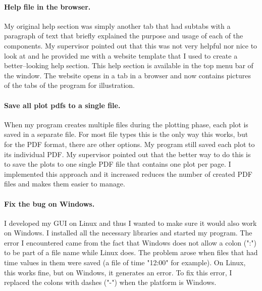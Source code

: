 \documentclass[../00_main.tex]{subfiles}
\begin{document}
\paragraph{Help file in the browser.} My original help section was simply
another tab that had subtabs with a paragraph of text that briefly explained
the purpose and usage of each of the components. My supervisor pointed out that
this was not very helpful nor nice to look at and he provided me with a website
template that I used to create a better--looking help section. This help
section is available in the top menu bar of the window. The website opens in
a tab in a browser and now contains pictures of the tabs of the program for
illustration.

\paragraph{Save all plot pdfs to a single file.} When my program creates
multiple files during the plotting phase, each plot is saved in a separate file.
For most file types this is the only way this works, but for the PDF format,
there are other options. My program still saved each plot to its individual
PDF. My supervisor pointed out that the better way to do this is to save the
plots to one single PDF file that contains one plot per page. I implemented
this approach and it increased reduces the number of created PDF files and
makes them easier to manage.

\paragraph{Fix the bug on Windows.} I developed my GUI on Linux and thus
I wanted to make sure it would also work on Windows. I installed all the
necessary libraries and started my program. The error I encountered came from
the fact that Windows does not allow a colon (":") to be part of a file name
while Linux does. The problem arose when files that had time values in them
were saved (a file of time "12:00" for example). On Linux, this works fine, but
on Windows, it generates an error. To fix this error, I replaced the colons
with 
dashes ("-") when the platform is Windows.
\end{document}
